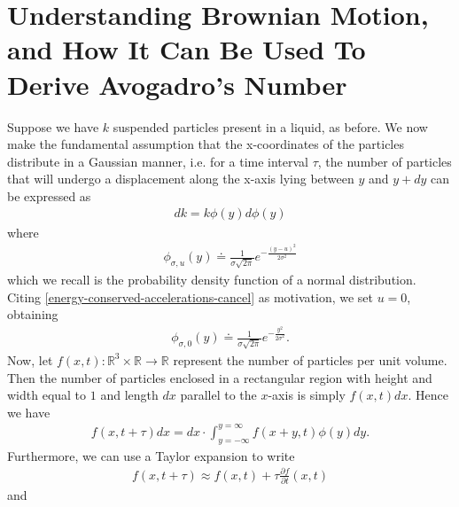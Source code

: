 \documentclass[12pt,reqno]{amsart}
\newcommand{\rr}{\mathbb{R}}
\newcommand{\p}{\partial}
\theoremstyle{plain}  %
\theoremstyle{definition}
\begin{document}
\section{Understanding Brownian Motion, and How It Can Be Used To Derive Avogadro's
Number}
Suppose we have $k$ suspended particles present in a liquid, as before. We now make the
fundamental assumption that the x-coordinates of the particles distribute in a Gaussian
manner, i.e. for a time interval $\tau$, the number of particles that will undergo a displacement along the x-axis lying
between $y$ and $y + dy$ can be
expressed as
\begin{equation*}
	\begin{split}
		dk = k \phi(y) d\phi(y)
		\label{1}
	\end{split}
\end{equation*}
where 
\begin{equation*}
	\begin{split}
		\phi_{\sigma, u}(y) \doteq \frac{1}{ \sigma \sqrt{2 \pi}} e^{-\frac{(y-u)^2}{2 \sigma^2}}
	\end{split}
\end{equation*}
which we recall is the probability density function of a normal
distribution. Citing \eqref{energy-conserved-accelerations-cancel} as motivation,
we set $u = 0$, obtaining 
\begin{equation}
	\begin{split}
		\phi_{\sigma, 0}(y) \doteq \frac{1}{ \sigma \sqrt{2 \pi}} e^{-\frac{y^2}{2 \sigma^2}}.
		\label{2}
	\end{split}
\end{equation}
Now, let $f(x,t): \rr^3 \times \rr \to \rr$ represent the number of particles per unit volume. Then
the number of particles enclosed in a rectangular region with height and width equal
to $1$ and length $dx$ parallel to the $x$-axis is simply $f(x,t) dx$. Hence we have
\begin{equation}
	\begin{split}
		f(x,t + \tau) dx = dx \cdot \int_{y=-\infty}^{y=\infty} f(x+y, t) \phi(y) dy.
		\label{3}
	\end{split}
\end{equation}
Furthermore, we can use a Taylor expansion to write
\begin{equation}
	\begin{split}
		f(x, t + \tau) \approx f(x,t) + \tau \frac{\p f}{\p t}(x,t)
		\label{4}
	\end{split}
\end{equation}
and
\end{document}
